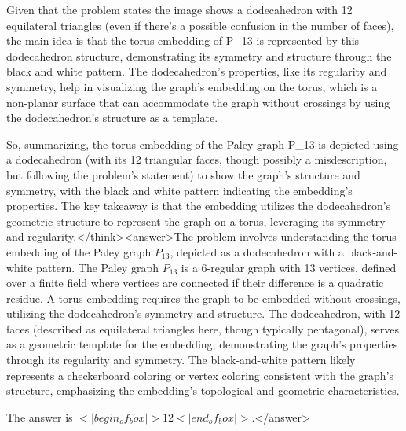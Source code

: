 Given that the problem states the image shows a dodecahedron with 12 equilateral triangles (even if there's a possible confusion in the number of faces), the main idea is that the torus embedding of P_13 is represented by this dodecahedron structure, demonstrating its symmetry and structure through the black and white pattern. The dodecahedron's properties, like its regularity and symmetry, help in visualizing the graph's embedding on the torus, which is a non-planar surface that can accommodate the graph without crossings by using the dodecahedron's structure as a template. 

So, summarizing, the torus embedding of the Paley graph P_13 is depicted using a dodecahedron (with its 12 triangular faces, though possibly a misdescription, but following the problem's statement) to show the graph's structure and symmetry, with the black and white pattern indicating the embedding's properties. The key takeaway is that the embedding utilizes the dodecahedron's geometric structure to represent the graph on a torus, leveraging its symmetry and regularity.</think><answer>The problem involves understanding the torus embedding of the Paley graph \( P_{13} \), depicted as a dodecahedron with a black-and-white pattern. The Paley graph \( P_{13} \) is a 6-regular graph with 13 vertices, defined over a finite field where vertices are connected if their difference is a quadratic residue. A torus embedding requires the graph to be embedded without crossings, utilizing the dodecahedron's symmetry and structure. The dodecahedron, with 12 faces (described as equilateral triangles here, though typically pentagonal), serves as a geometric template for the embedding, demonstrating the graph's properties through its regularity and symmetry. The black-and-white pattern likely represents a checkerboard coloring or vertex coloring consistent with the graph's structure, emphasizing the embedding's topological and geometric characteristics.  

The answer is \(<|begin_of_box|>12<|end_of_box|>\).</answer>